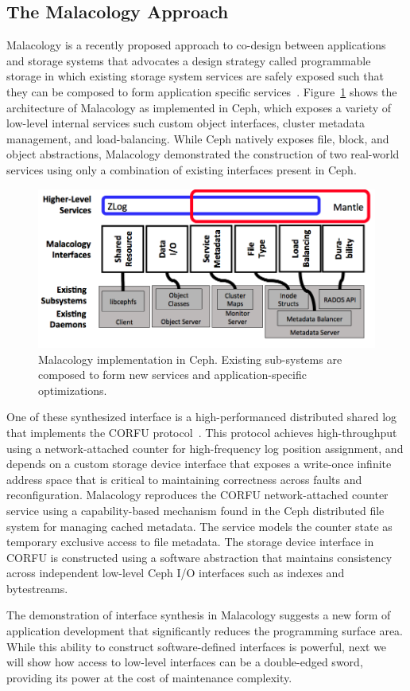 \subsection{The Malacology Approach}

Malacology is a recently proposed approach to co-design between applications
and storage systems that advocates a design strategy called programmable
storage in which existing storage system services are safely exposed such that
they can be composed to form application specific
services~\cite{msevilla:eurosys17}.
Figure~\ref{fig:malacology} shows the architecture of Malacology as
implemented in Ceph, which exposes a variety of low-level internal services
such custom object interfaces, cluster metadata management, and
load-balancing. While Ceph natively exposes file, block, and object
abstractions, Malacology demonstrated the construction of two real-world
services using only a combination of existing interfaces present in Ceph.

\begin{figure}[t]
\centering
\includegraphics[width=1.0\linewidth]{implementation-overview.png}
\caption{Malacology implementation in Ceph. Existing sub-systems are composed
    to form new services and application-specific optimizations.}
\label{fig:malacology}
\end{figure}

One of these synthesized interface is a high-performanced distributed shared
log that implements the CORFU protocol~\cite{balakrishnan:nsdi12}.
This protocol achieves high-throughput
using a network-attached
counter for high-frequency log position assignment, and depends on a custom
storage device interface that exposes a write-once infinite address space that
is critical to maintaining correctness across faults and reconfiguration.
Malacology reproduces the CORFU
network-attached counter service using a capability-based mechanism found in
the Ceph distributed file system for managing cached metadata. The service
models the counter state as temporary exclusive access to file metadata.
The storage device interface in
CORFU is constructed using a software abstraction that maintains consistency
across independent low-level Ceph I/O interfaces such as indexes and
bytestreams.

The demonstration of interface synthesis in Malacology suggests a new form of
application development that significantly reduces the programming surface
area. While this ability to construct software-defined interfaces is powerful,
next we will show how access to low-level interfaces can be a double-edged
sword, providing its power at the cost of maintenance complexity.
